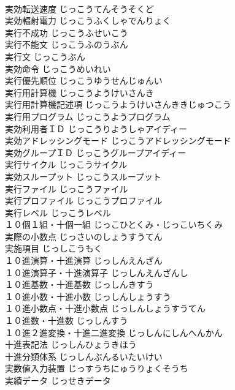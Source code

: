 \documentclass[8pt]{extreport}
\begin{document}
\begin{CJK}{UTF8}{min}
\\	実効転送速度	じっこうてんそうそくど	
\\	実効輻射電力	じっこうふくしゃでんりょく	
\\	実行不成功	じっこうふせいこう	
\\	実行不能文	じっこうふのうぶん	
\\	実行文	じっこうぶん	
\\	実効命令	じっこうめいれい	
\\	実行優先順位	じっこうゆうせんじゅんい	
\\	実行用計算機	じっこうようけいさんき	
\\	実行用計算機記述項	じっこうようけいさんききじゅつこう	
\\	実行用プログラム	じっこうようプログラム	
\\	実効利用者ＩＤ	じっこうりようしゃアイディー	
\\	実効アドレッシングモード	じっこうアドレッシングモード	
\\	実効グループＩＤ	じっこうグループアイディー	
\\	実行サイクル	じっこうサイクル	
\\	実効スループット	じっこうスループット	
\\	実行ファイル	じっこうファイル	
\\	実行プロファイル	じっこうプロファイル	
\\	実行レベル	じっこうレベル	
\\	１０個１組・十個一組	じっこひとくみ・じっこいちくみ	
\\	実際の小数点	じっさいのしょうすうてん	
\\	実施項目	じっしこうもく	
\\	１０進演算・十進演算	じっしんえんざん	
\\	１０進演算子・十進演算子	じっしんえんざんし	
\\	１０進基数・十進基数	じっしんきすう	
\\	１０進小数・十進小数	じっしんしょうすう	
\\	１０進小数点・十進小数点	じっしんしょうすうてん	
\\	１０進数・十進数	じっしんすう	
\\	１０進２進変換・十進二進変換	じっしんにしんへんかん	
\\	十進表記法	じっしんひょうきほう	
\\	十進分類体系	じっしんぶんるいたいけい	
\\	実数値入力装置	じっすうちにゅうりょくそうち	
\\	実績データ	じっせきデータ	

\end{CJK}
\end{document}
